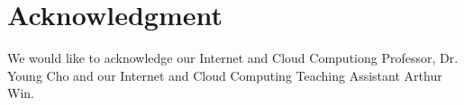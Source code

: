\documentclass[conference]{IEEEtran}
\begin{document}
%












\section*{Acknowledgment}

We would like to acknowledge our Internet and Cloud Computiong Professor, Dr. Young Cho and our Internet and Cloud Computing  Teaching Assistant Arthur Win.
\end{document}
